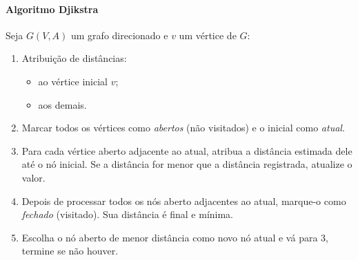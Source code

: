 \begin{frame}[label=notas]
	\framesubtitle{Algoritmo Djikstra}
	
	Seja $G(V,A)$ um grafo direcionado e $v$ um vértice de $G$:
	\begin{enumerate}
		\item Atribuição de distâncias:
			\begin{itemize}
				\item[0] ao vértice inicial $v$;
				\item[$\infty$] aos demais.
			\end{itemize}
		\item Marcar todos os vértices como \emph{abertos} (não visitados) e o 
		inicial como \emph{atual}.
		\item Para cada vértice aberto adjacente ao atual, atribua a 
		\alert{distância estimada dele até o nó inicial}. Se a distância for 
		menor que a distância registrada, atualize o valor.
		\item Depois de processar todos os nós aberto adjacentes ao atual, 
		marque-o como \emph{fechado} (visitado). Sua distância é final e mínima.
		\item Escolha o nó aberto de menor distância como novo nó atual e vá para 
		3, termine se não houver.
	\end{enumerate}
\end{frame}

\newcommand{\lbl}[4][1-]{%
	\node<#1>[label=#2:{\small\textcolor{red}{(#3)}}] at(#4) {};
}
\newcommand{\connectWithLabel}[5][1-]{%
	\draw<#1> (#2) --  node[auto,#5] {#4} (#3);
}
\newcommand{\desenhaNode}[3]{%
	\node<#1>[circle, draw, fill, #2] at(#3) (#3) {\textcolor{black}{#3}};
}%
\newcommand{\fechado}[2][1-]{%
	\desenhaNode{#1}{blueUnB!50}{#2}
}%
\newcommand{\aberto}[2][1-]{%
	\desenhaNode{#1}{red!50}{#2}
}%

\newcommand{\atual}[2][1-]{%
	\desenhaNode{#1}{greenUnB!50}{#2}
}%

